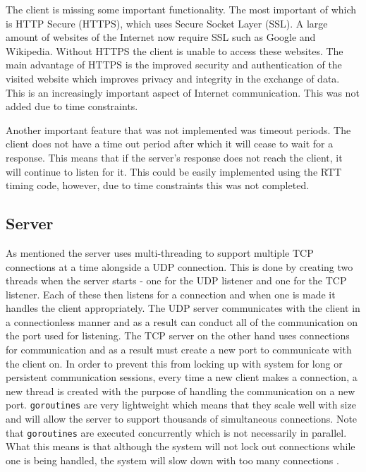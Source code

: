 \documentclass[10pt,twocolumn]{witseiepaper}
\begin{document}
	The client is missing some important functionality. The most important of which is HTTP Secure (HTTPS), which uses Secure Socket Layer (SSL). A large amount of websites of the Internet now require SSL such as Google and Wikipedia. Without HTTPS the client is unable to access these websites. The main advantage of HTTPS is the improved security and authentication of the visited website which improves privacy and integrity in the exchange of data. This is an increasingly important aspect of Internet communication. This was not added due to time constraints.

	Another important feature that was not implemented was timeout periods. The client does not have a time out period after which it will cease to wait for a response. This means that if the server's response does not reach the client, it will continue to listen for it. This could be easily implemented using the RTT timing code, however, due to time constraints this was not completed.

	\subsection{Server}

	As mentioned the server uses multi-threading to support multiple TCP connections at a time alongside a UDP connection. This is done by creating two threads when the server starts - one for the UDP listener and one for the TCP listener. Each of these then listens for a connection and when one is made it handles the client appropriately. The UDP server communicates with the client in a connectionless manner and as a result can conduct all of the communication on the port used for listening. The TCP server on the other hand uses connections for communication and as a result must create a new port to communicate with the client on. In order to prevent this from locking up with system for long or persistent communication sessions, every time a new client makes a connection, a new thread is created with the purpose of handling the communication on a new port. \texttt{goroutines} are very lightweight which means that they scale well with size and will allow the server to support thousands of simultaneous connections. Note that \texttt{goroutines} are executed concurrently which is not necessarily in parallel. What this means is that although the system will not lock out connections while one is being handled, the system will slow down with too many connections \cite{doxsey}.
\end{document}
